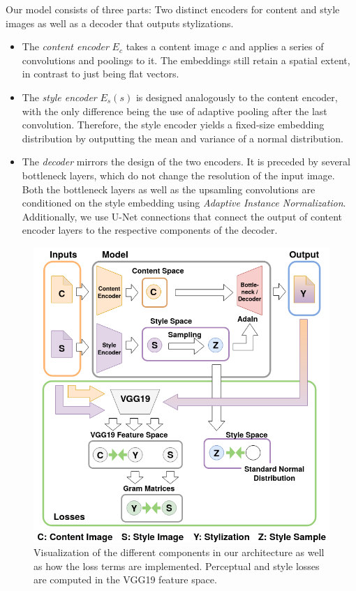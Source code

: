 \documentclass[10pt,twocolumn,letterpaper]{article}
\begin{document}
Our model consists of three parts: Two distinct encoders for content and style images as well as a decoder that outputs stylizations.
\begin{itemize}
	\item The \textit{content encoder} $E_c$ takes a content image $c$ and applies a series of convolutions and poolings to it. The embeddings still retain a spatial extent, in contrast to just being flat vectors.
	\item The \textit{style encoder} $E_s(s)$ is designed analogously to the content encoder, with the only difference being the use of adaptive pooling after the last convolution. Therefore, the style encoder yields a fixed-size embedding distribution by outputting the mean and variance of a normal distribution.
	\item The \textit{decoder} mirrors the design of the two encoders. It is preceded by several bottleneck layers, which do not change the resolution of the input image. Both the bottleneck layers as well as the upsamling convolutions are conditioned on the style embedding using \textit{Adaptive Instance Normalization}. Additionally, we use U-Net connections that connect the output of content encoder layers to the respective components of the decoder.
\end{itemize}
	
\begin{figure}
\centering
\includegraphics[width=0.9\linewidth]{pipeline_reduced_semi_verbose.png}
\caption{Visualization of the different components in our architecture as well as how the loss terms are implemented. Perceptual and style losses are computed in the VGG19 feature space.}
\label{fig:model}
\end{figure}
	
\end{document}
